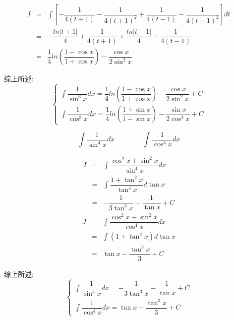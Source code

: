 \begin{corollary}[扩展不定积分]
\begin{solution}
		\begin{eqnarray*}
			I & = & \int\left[ -\dfrac{1}{4(t+1)}-\dfrac{1}{4(t+1)^2}+\dfrac{1}{4(t-1)}-\dfrac{1}{4(t-1)^2}\right]dt\\
			  & = & -\dfrac{ln|t+1|}{4}+\dfrac{1}{4(t+1)}+\dfrac{ln|t-1|}{4}+\dfrac{1}{4(t-1)}\\
			  & = & \dfrac{1}{4}ln\left(\dfrac{1-\cos x}{1+\cos x} \right)-\dfrac{\cos x}{2\sin^2 x}
		\end{eqnarray*}

		综上所述:
		$$\begin{cases}
			\int \dfrac{1}{\sin^{3}x} dx = \dfrac{1}{4}ln\left(\dfrac{1-\cos x}{1+\cos x} \right)-\dfrac{\cos x}{2\sin^2 x} +C  \\ 
			\int \dfrac{1}{\cos^{3}x} dx = \dfrac{1}{4}ln\left(\dfrac{1+\sin x}{1-\sin x} \right)-\dfrac{\sin x}{2\cos^2 x} +C  
		\end{cases}$$
	\end{solution}



	\begin{proposition}
		$$\int \dfrac{1}{\sin^{4}x} dx\qquad\qquad \int \dfrac{1}{\cos^{4} x}dx $$
	\end{proposition}
	\begin{solution}
		\begin{eqnarray*}
			I & = & \int \dfrac{\cos^2 x+\sin^2 x}{\sin^4 x}dx\\
			  & = & \int \dfrac{1+\tan^2 x}{\tan^4x}d\tan x\\
			  & = & -\dfrac{1}{3\tan^3 x}-\dfrac{1}{\tan x}+C 
		\end{eqnarray*}
		\begin{eqnarray*}
			J & = & \int \dfrac{\cos^2 x+\sin^2 x}{\cos^4 x}dx\\
			  & = & \int (1+\tan^2 x)d\tan x\\
			  & = & \tan x-\dfrac{\tan^{3}x}{3}+C 
		\end{eqnarray*}

		综上所述:
		$$\begin{cases}
			\int \dfrac{1}{\sin^{4}x} dx = -\dfrac{1}{3\tan^3 x}-\dfrac{1}{\tan x}+C  \\ 
			\int \dfrac{1}{\cos^{4}x} dx = \tan x-\dfrac{\tan^{3}x}{3}+C   
		\end{cases}$$
	\end{solution}




\end{corollary}

